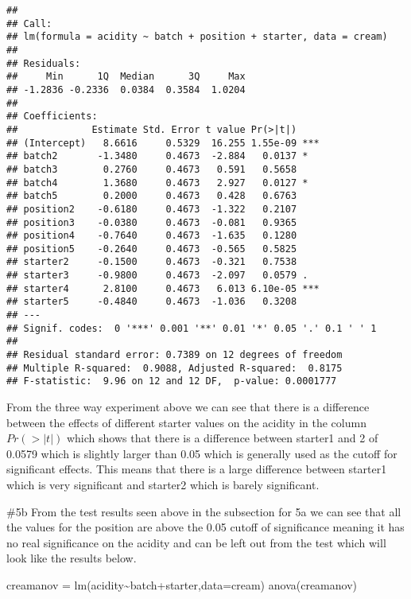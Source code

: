 \documentclass[
]{article}
\newenvironment{Shaded}{\begin{snugshade}}{\end{snugshade}}
\newcommand{\AttributeTok}[1]{\textcolor[rgb]{0.77,0.63,0.00}{#1}}
\newcommand{\FunctionTok}[1]{\textcolor[rgb]{0.00,0.00,0.00}{#1}}
\newcommand{\NormalTok}[1]{#1}
\newcommand{\OtherTok}[1]{\textcolor[rgb]{0.56,0.35,0.01}{#1}}
\newcommand{\SpecialCharTok}[1]{\textcolor[rgb]{0.00,0.00,0.00}{#1}}
\begin{document}
\begin{verbatim}
## 
## Call:
## lm(formula = acidity ~ batch + position + starter, data = cream)
## 
## Residuals:
##     Min      1Q  Median      3Q     Max 
## -1.2836 -0.2336  0.0384  0.3584  1.0204 
## 
## Coefficients:
##             Estimate Std. Error t value Pr(>|t|)    
## (Intercept)   8.6616     0.5329  16.255 1.55e-09 ***
## batch2       -1.3480     0.4673  -2.884   0.0137 *  
## batch3        0.2760     0.4673   0.591   0.5658    
## batch4        1.3680     0.4673   2.927   0.0127 *  
## batch5        0.2000     0.4673   0.428   0.6763    
## position2    -0.6180     0.4673  -1.322   0.2107    
## position3    -0.0380     0.4673  -0.081   0.9365    
## position4    -0.7640     0.4673  -1.635   0.1280    
## position5    -0.2640     0.4673  -0.565   0.5825    
## starter2     -0.1500     0.4673  -0.321   0.7538    
## starter3     -0.9800     0.4673  -2.097   0.0579 .  
## starter4      2.8100     0.4673   6.013 6.10e-05 ***
## starter5     -0.4840     0.4673  -1.036   0.3208    
## ---
## Signif. codes:  0 '***' 0.001 '**' 0.01 '*' 0.05 '.' 0.1 ' ' 1
## 
## Residual standard error: 0.7389 on 12 degrees of freedom
## Multiple R-squared:  0.9088, Adjusted R-squared:  0.8175 
## F-statistic:  9.96 on 12 and 12 DF,  p-value: 0.0001777
\end{verbatim}

From the three way experiment above we can see that there is a
difference between the effects of different starter values on the
acidity in the column \(Pr(>|t|)\) which shows that there is a
difference between starter1 and 2 of 0.0579 which is slightly larger
than 0.05 which is generally used as the cutoff for significant effects.
This means that there is a large difference between starter1 which is
very significant and starter2 which is barely significant.

\#5b From the test results seen above in the subsection for 5a we can
see that all the values for the position are above the 0.05 cutoff of
significance meaning it has no real significance on the acidity and can
be left out from the test which will look like the results below.

\begin{Shaded}
\begin{Highlighting}[]
\NormalTok{creamanov }\OtherTok{=} \FunctionTok{lm}\NormalTok{(acidity}\SpecialCharTok{\textasciitilde{}}\NormalTok{batch}\SpecialCharTok{+}\NormalTok{starter,}\AttributeTok{data=}\NormalTok{cream)}
\FunctionTok{anova}\NormalTok{(creamanov)}
\end{Highlighting}
\end{Shaded}
\end{document}
